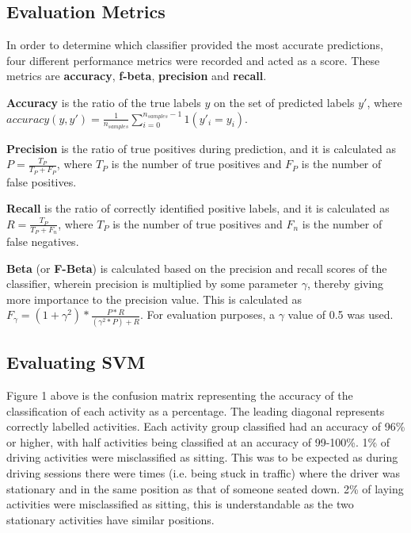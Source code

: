 \subsection{Evaluation Metrics}

In order to determine which classifier provided the most accurate predictions, four different performance metrics were recorded and acted as a score. These metrics are \textbf{accuracy},
\textbf{f-beta}, \textbf{precision} and \textbf{recall}.

\textbf{Accuracy} is the ratio of the true labels $y$ on the set of predicted labels $y'$, where \(accuracy(y, y') = \frac{1}{n_{samples}}\sum_{i=0}^{n_{samples}-1} 1(y'_i = y_i)\).

\textbf{Precision} is the ratio of true positives during prediction, and it is calculated as \(P = \frac{T_P}{T_P+F_P}\), where \(T_P\) is the number of true positives and \(F_P\) is the number of false positives.

\textbf{Recall} is the ratio of correctly identified positive labels, and it is calculated as \(R = \frac{T_P}{T_P+F_n}\), where \(T_P\) is the number of true positives and \(F_n\) is the number of false negatives.

\textbf{Beta} (or \textbf{F-Beta})  is calculated based on the precision and recall scores of the classifier, wherein precision is multiplied by some parameter $\gamma$, thereby giving more
importance to the precision value. This is calculated as  \(F_\gamma = (1+\gamma^2) * \frac{P*R}{(\gamma^2*P)+R}\). For evaluation purposes, a $\gamma$ value of 0.5 was used.

\subsection{Evaluating SVM}

Figure 1 above is the confusion matrix representing the accuracy of the classification of each activity as a percentage. The leading diagonal represents correctly labelled activities. Each activity group classified had an accuracy of 96\% or higher, with half activities being classified at an accuracy of 99-100\%.
1\% of driving activities were misclassified as sitting. This was to be expected as during driving sessions there were times (i.e. being stuck in traffic) where the driver was stationary and in the same position as that of someone seated down.
2\% of laying activities were misclassified as sitting, this is understandable as the two stationary activities have similar positions.